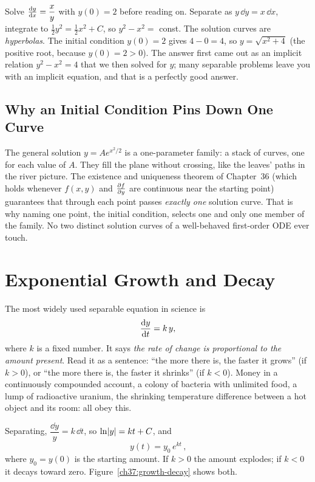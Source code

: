 \begin{labbox}
Solve $\frac{\mathrm{d} y}{\mathrm{d} x} = \dfrac{x}{y}$ with $y(0)=2$ before reading on. Separate as
$y\,\dd y = x\,\dd x$, integrate to $\tfrac12 y^2 = \tfrac12 x^2 + C$, so
$y^2 - x^2 = $ const. The solution curves are \emph{hyperbolas}. The initial
condition $y(0)=2$ gives $4 - 0 = 4$, so $y = \sqrt{x^2+4}$ (the positive root,
because $y(0)=2>0$). The answer first came out as an
implicit relation $y^2-x^2=4$ that we then solved for $y$; many separable problems
leave you with an implicit equation, and that is a perfectly good answer.
\end{labbox}

\subsection{Why an Initial Condition Pins Down One Curve}

\begin{connectionbox}
The general solution $y=Ae^{x^2/2}$ is a one-parameter family: a stack of
curves, one for each value of $A$. They fill the plane without crossing, like
the leaves' paths in the river picture. The existence and uniqueness theorem of
Chapter~36 (which
holds whenever $f(x,y)$ and $\frac{\partial f}{\partial y}$ are continuous near the starting point)
guarantees that through each point passes \emph{exactly one} solution curve. That is
why naming one point, the initial condition, selects one and only one member of the
family. No two distinct solution curves of a well-behaved first-order ODE ever
touch.
\end{connectionbox}

\section{Exponential Growth and Decay}

The most widely used separable equation in science is
\[
  \frac{\mathrm{d} y}{\mathrm{d} t} = k\,y,
\]
where $k$ is a fixed number. It says \emph{the rate of change is proportional to
the amount present}. Read it
as a sentence: ``the more there is, the faster it grows'' (if $k>0$), or ``the more
there is, the faster it shrinks'' (if $k<0$). Money in a continuously compounded
account, a colony of bacteria with unlimited food, a lump of radioactive uranium,
the shrinking temperature difference between a hot object and its room: all obey this.

Separating, $\dfrac{\dd y}{y} = k\,\dd t$, so $\ln\lvert y\rvert = kt + C$, and
\[
  \boxed{\,y(t) = y_0\,e^{kt}\,},
\]
where $y_0=y(0)$ is the starting amount. If $k>0$ the amount explodes; if $k<0$ it
decays toward zero. Figure~\ref{ch37:growth-decay} shows both.

